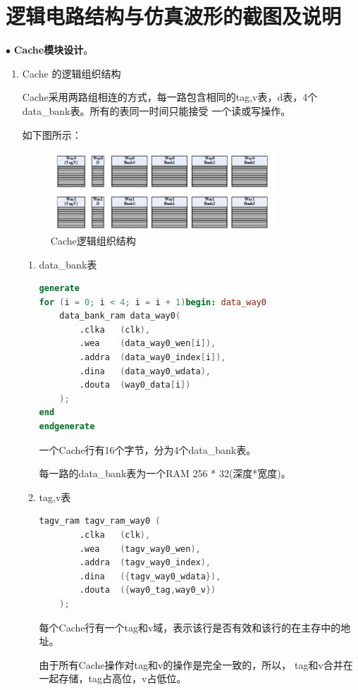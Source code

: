 \documentclass[11pt]{article}
\begin{document}


\section{逻辑电路结构与仿真波形的截图及说明}
\noindent
$\bullet$
\textbf{Cache模块设计}。
\begin{enumerate}
    \item Cache 的逻辑组织结构
    
    Cache采用两路组相连的方式，每一路包含相同的tag,v表，d表，4个data\_bank表。所有的表同一时间只能接受
    一个读或写操作。
    
    如下图所示：
    \begin{figure}[H]
        \centering
        \includegraphics[width=0.8\textwidth]{fig/fig1.png}
        \caption{Cache逻辑组织结构}
        \label{fig:1}
    \end{figure}
    \begin{enumerate}
        \item data\_bank表
\begin{lstlisting}[language=verilog]
generate
for (i = 0; i < 4; i = i + 1)begin: data_way0
    data_bank_ram data_way0(
        .clka   (clk),
        .wea    (data_way0_wen[i]),   
        .addra  (data_way0_index[i]),
        .dina   (data_way0_wdata),
        .douta  (way0_data[i])  
    );
end
endgenerate
\end{lstlisting}
        一个Cache行有16个字节，分为4个data\_bank表。
        
        每一路的data\_bank表为一个RAM 256 * 32(深度*宽度)。

        \item tag,v表
\begin{lstlisting}[language=verilog]
    tagv_ram tagv_ram_way0 (
        .clka   (clk), 
        .wea    (tagv_way0_wen),
        .addra  (tagv_way0_index),
        .dina   ({tagv_way0_wdata}),
        .douta  ({way0_tag,way0_v})
    );
\end{lstlisting}    
        每个Cache行有一个tag和v域，表示该行是否有效和该行的在主存中的地址。

        由于所有Cache操作对tag和v的操作是完全一致的，所以，
        tag和v合并在一起存储，tag占高位，v占低位。
        

\end{enumerate}
\end{enumerate}
\end{document}
